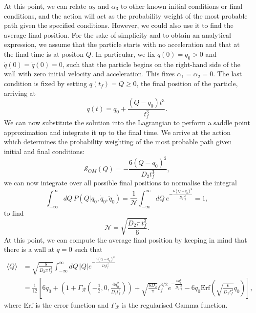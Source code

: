 \documentclass[aps,pra,amsmath,amssymb,amsthm,floatfix,nofootinbib,notitlepage,superscriptaddress,10pt]{revtex4-2}
\begin{document}
At this point, we can relate $\alpha_2$ and $\alpha_3$ to other known initial conditions or final conditions, and the action will act as the probability weight of the most probable path given the specified conditions. However, we could also use it to find the average final position. For the sake of simplicity and to obtain an analytical expression, we assume that the particle starts with no acceleration and that at the final time is at positon $Q$.
In particular, we fix $q(0)=q_0>0$ and $\dot{q}(0)=\ddot{q}(0)=0$, such that the particle begins on the right-hand side of the wall with zero initial velocity and acceleration. This fixes $\alpha_1=\alpha_2=0$. The last condition is fixed by setting $q(t_f)=Q\geq 0$, the final position of the particle, arriving at
\begin{equation}
	q(t) = q_0 + \frac{(Q-q_0)t^3}{t_f^3}.
\end{equation}
We can now substitute the solution into the Lagrangian to perform a saddle point approximation and integrate it up to the final time. We arrive at the action which determines the probability weighting of the most probable path given initial and final conditions:
\begin{equation}
	\mathcal{S}_{OM}(Q)= -\frac{6(Q-q_0)^2}{D_2 t_f^3},
\end{equation}
we can now integrate over all possible final positions to normalise the integral
\begin{equation}
	\int_{-\infty}^{\infty} dQ\, P(Q|q_0,\dot{q}_0,\ddot{q}_0)=\frac{1}{\mathcal{N}}\int_{-\infty}^{\infty} dQ\, e^{-\frac{6(Q-q_0)^2}{D_2 t_f^3}} = 1,
\end{equation}
to find 
\begin{equation}
	\mathcal{N} = \sqrt{\frac{D_2\pi\, t_f^3}{6}}.
\end{equation}
At this point, we can compute the average final position by keeping in mind that there is a wall at $q=0$ such that
\begin{equation}
	\label{eq: final_avg}
	\begin{split}
		\langle Q\rangle &= \sqrt{\frac{6}{D_2\pi\, t_f^3}}\int_{-\infty}^{\infty} dQ\, |Q| e^{-\frac{6(Q-q_0)^2}{D_2 t_f^3}} \\
		&= \frac{1}{12} \left[6q_0+\left(1+\Gamma_{\mathcal{R}}\left(-\frac{1}{2},0,\frac{6 q_0^2}{D_2 t_f^3}\right)\right)+\sqrt{\frac{6D_2}{\pi }} t_f^{3/2} e^{-\frac{6 q_0^2}{D_2 t_f^3}}-6 q_0 \text{Erf}\left(\sqrt{\frac{6}{D_2 t_f^3}}q_0\right)\right],
	\end{split}
\end{equation}
where $\text{Erf}$ is the error function and $\Gamma_{\mathcal{R}}$ is the regularised Gamma function. 
\end{document}
